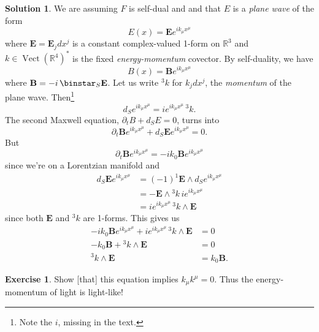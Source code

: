 \documentclass[11pt, a4paper]{report}
\theoremstyle{definition}
\newtheorem{exercise}{Exercise}[part]
\newtheorem{solution}{Solution}[part]
\newenvironment{ex}{\begin{exercise}}{\end{exercise}\pagebreak[1]}
\newenvironment{sol}{\begin{solution}}{\end{solution}\pagebreak[3]}
\renewcommand*{\star}{\ensuremath\mathop{}\mathopen\binstar\mathord{}}
\DeclareMathOperator{\Vect}{Vect}
\begin{document}
\begin{sol}

We are assuming $F$ is self-dual and and that $E$ is a \emph{plane wave} of the form
\[
    E(x) = \mathbf{E} e^{i k_\mu x^\mu}
\]
where $\mathbf{E} = \mathbf{E}_j dx^j$ is a constant complex-valued 1-form on $\mathbb{R}^3$
and $k \in {\Vect(\mathbb{R}^4)}^*$ is the fixed \emph{energy-momentum} covector.
By self-duality, we have
\[
    B(x) = \mathbf{B} e^{i k_\mu x^\mu}
\]
where $\mathbf{B} = -i \star_S \mathbf{E}$.
Let us write $^3 k$ for $k_j dx^j$, the \emph{momentum} of the plane wave.
Then\footnote{Note the $i$, missing in the text.}
\[
    d_S e^{i k_\mu x^\mu} = ie^{i k_\mu x^\mu} \, ^3 k.
\]
The second Maxwell equation, $\partial_t B + d_S E = 0$, turns into
\[
    \partial_t \mathbf{B} e^{i k_\mu x^\mu} + d_S \mathbf{E} e^{i k_\mu x^\mu} = 0.
\]
But
\[
    \partial_t \mathbf{B} e^{i k_\mu x^\mu} = -ik_0 \mathbf{B} e^{i k_\mu x^\mu}
\]
since we're on a Lorentzian manifold and
\begin{align*}
    d_S \mathbf{E} e^{i k_\mu x^\mu} &= {(-1)}^1 \mathbf{E} \wedge d_S e^{i k_\mu x^\mu} \\
        &= -\mathbf{E} \wedge {}^3 k \, i e^{i k_\mu x^\mu} \\
        &= i e^{i k_\mu x^\mu} \, ^3 k \wedge \mathbf{E}
\end{align*}
since both $\mathbf{E}$ and $^3 k$ are 1-forms.
This gives us
\begin{align*}
    -ik_0 \mathbf{B} e^{i k_\mu x^\mu} + i e^{i k_\mu x^\mu} \, ^3 k \wedge \mathbf{E} &= 0 \\
    -k_0 \mathbf{B} + {}^3 k \wedge \mathbf{E} &= 0 \\
    ^3 k \wedge \mathbf{E} &= k_0 \mathbf{B}.
\end{align*}

\end{sol}

\begin{ex}

Show [that] this equation implies $k_\mu k^\mu = 0$. Thus the energy-momentum of light is light-like!

\end{ex}
\end{document}
